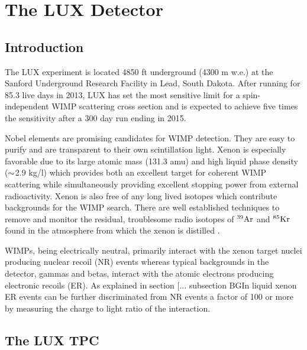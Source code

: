 

\renewcommand{\thechapter}{2}

\chapter{The LUX Detector}

\section{Introduction}

The LUX experiment is located 4850 ft underground (4300 m w.e.) at the Sanford Underground Research Facility in Lead, South Dakota. After running for 85.3 live days in 2013, LUX has set the most sensitive limit for a spin-independent WIMP scattering cross section \cite{LUX_PRL} and is expected to achieve five times the sensitivity after a 300 day run ending in 2015. 

Nobel elements are promising candidates for WIMP detection. They are easy to purify and are transparent to their own scintillation light. Xenon is especially favorable due to its  large atomic mass (131.3 amu) and high liquid phase density ($\rm \sim$2.9 kg/l) which provides both an excellent target for coherent WIMP scattering while simultaneously providing excellent stopping power from external radioactivity. Xenon is also free of any long lived isotopes which contribute backgrounds for the WIMP search. There are well established techniques to remove and monitor the residual, troublesome radio isotopes of $\rm ^{39}Ar$ and $\rm^{85}Kr$ found in the atmosphere from which the xenon is distilled \cite{Aprile_LXe_overview} \cite{Kr_ppt_Dobi} \cite{lux_kr_removal} \cite{xmass_kr_removal}.
 
WIMPs, being electrically neutral, primarily interact with the xenon target nuclei producing nuclear recoil (NR) events whereas typical backgrounds in the detector, gammas and betas, interact with the atomic electrons producing electronic recoils (ER). As explained in section [... subsection BGIn liquid xenon ER events can be further discriminated from NR events a factor of 100 or more by measuring the charge to light ratio of the interaction.



\section{The LUX TPC}


